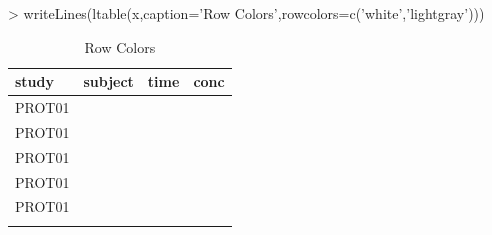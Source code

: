 \documentclass[titlepage]{article}
\begin{document}
\begin{Schunk}
\begin{Sinput}
> writeLines(ltable(x,caption='Row Colors',rowcolors=c('white','lightgray')))
\end{Sinput}
\begin{table}[!htpb]
 \caption[Row Colors]{Row Colors }
 \begin{center}
  \begin{tabular}{lrrr}
    \hline \hline
   study & subject & time & conc \\ \hline
   \rowcolor{white}PROT01 & \verb#1001# & \verb#0# & \verb#0.12# \\
   \rowcolor{lightgray}PROT01 & \verb#1001# & \verb#1# & \verb#34.00# \\
   \rowcolor{white}PROT01 & \verb#1001# & \verb#2# & \verb#5.60# \\
   \rowcolor{lightgray}PROT01 & \verb#1002# & \verb#0# & \verb#0.50# \\
   \rowcolor{white}PROT01 & \verb#1002# & \verb#1# & \verb#200.00# \\
   \rowcolor{lightgray} & \verb#1002# & \verb#2# & \verb## \\ \hline
  \end{tabular}
 \end{center}
\end{table}\end{Schunk}
\end{document}
